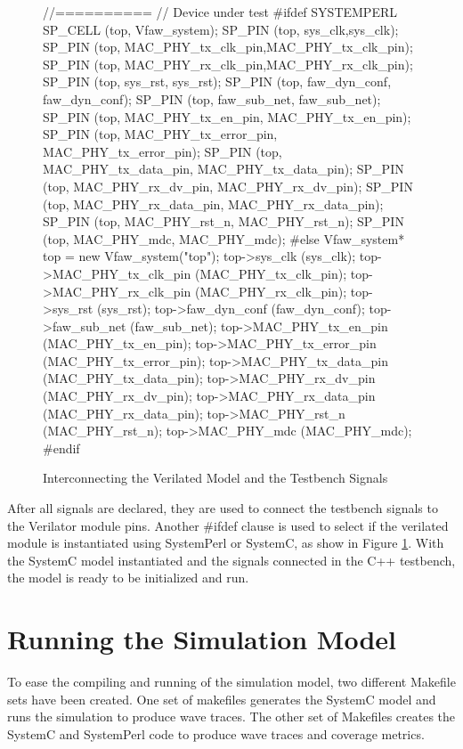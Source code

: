 \documentclass[defaultstyle,10pt,master,Helvetica]{thesis}
\begin{document}
\begin{figure}[H]
\begin{boxedverbatim}
	//==========
	// Device under test
#ifdef SYSTEMPERL
	SP_CELL (top, Vfaw_system);
	SP_PIN (top, sys_clk,sys_clk);
	SP_PIN (top, MAC_PHY_tx_clk_pin,MAC_PHY_tx_clk_pin);
	SP_PIN (top, MAC_PHY_rx_clk_pin,MAC_PHY_rx_clk_pin);
	SP_PIN (top, sys_rst,	sys_rst);
	SP_PIN (top, faw_dyn_conf,	faw_dyn_conf);
	SP_PIN (top, faw_sub_net,	faw_sub_net);
	SP_PIN (top, MAC_PHY_tx_en_pin,	MAC_PHY_tx_en_pin);
	SP_PIN (top, MAC_PHY_tx_error_pin,	MAC_PHY_tx_error_pin);
	SP_PIN (top, MAC_PHY_tx_data_pin,	MAC_PHY_tx_data_pin);
	SP_PIN (top, MAC_PHY_rx_dv_pin,	MAC_PHY_rx_dv_pin);
	SP_PIN (top, MAC_PHY_rx_data_pin,	MAC_PHY_rx_data_pin);
	SP_PIN (top, MAC_PHY_rst_n,	MAC_PHY_rst_n);
	SP_PIN (top, MAC_PHY_mdc,	MAC_PHY_mdc);
#else
	Vfaw_system* top = new Vfaw_system("top");
	top->sys_clk		(sys_clk);
	top->MAC_PHY_tx_clk_pin	        (MAC_PHY_tx_clk_pin);
	top->MAC_PHY_rx_clk_pin		(MAC_PHY_rx_clk_pin);
	top->sys_rst	(sys_rst);
	top->faw_dyn_conf	(faw_dyn_conf);
	top->faw_sub_net	(faw_sub_net);
	top->MAC_PHY_tx_en_pin	        (MAC_PHY_tx_en_pin);
	top->MAC_PHY_tx_error_pin		(MAC_PHY_tx_error_pin);
	top->MAC_PHY_tx_data_pin	(MAC_PHY_tx_data_pin);
	top->MAC_PHY_rx_dv_pin	(MAC_PHY_rx_dv_pin);
	top->MAC_PHY_rx_data_pin	(MAC_PHY_rx_data_pin);
	top->MAC_PHY_rst_n	(MAC_PHY_rst_n);
	top->MAC_PHY_mdc	(MAC_PHY_mdc);
#endif

\end{boxedverbatim}
\caption{Interconnecting the Verilated Model and the Testbench Signals}
\label{chp4:faw_signal_interc}
\end{figure}

After all signals are declared, they are used to connect the testbench signals to the Verilator module pins. Another \#ifdef clause is used to select if the verilated module is instantiated using SystemPerl or SystemC, as show in Figure \ref{chp4:faw_signal_interc}. With the SystemC model instantiated and the signals connected in the C++ testbench,  the model is ready to be initialized and run.
\clearpage


\section{Running the Simulation Model}

To ease the compiling and running of the simulation model, two different Makefile sets have been created. One set of makefiles generates the SystemC model and runs the simulation to produce wave traces. The other set of Makefiles creates the SystemC and SystemPerl code to produce wave traces and coverage metrics.
\end{document}
